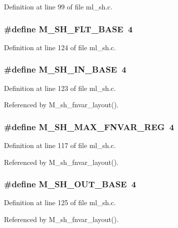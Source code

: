 Definition at line 99 of file ml\_\-sh.c.
\subsubsection{\setlength{\rightskip}{0pt plus 5cm}\#define M\_\-SH\_\-FLT\_\-BASE~4}\label{ml__sh_8c_44db1d3112e4bea8f4a00158c9dc2655}




Definition at line 124 of file ml\_\-sh.c.
\subsubsection{\setlength{\rightskip}{0pt plus 5cm}\#define M\_\-SH\_\-IN\_\-BASE~4}\label{ml__sh_8c_9855423f22bab7123e1c6e9ba0e6407b}




Definition at line 123 of file ml\_\-sh.c.

Referenced by M\_\-sh\_\-fnvar\_\-layout().
\subsubsection{\setlength{\rightskip}{0pt plus 5cm}\#define M\_\-SH\_\-MAX\_\-FNVAR\_\-REG~4}\label{ml__sh_8c_1c5cf2daf08367469b681e7524ece98e}




Definition at line 117 of file ml\_\-sh.c.

Referenced by M\_\-sh\_\-fnvar\_\-layout().
\subsubsection{\setlength{\rightskip}{0pt plus 5cm}\#define M\_\-SH\_\-OUT\_\-BASE~4}\label{ml__sh_8c_234b6bffa3a988f125d841700a9b8517}




Definition at line 125 of file ml\_\-sh.c.

Referenced by M\_\-sh\_\-fnvar\_\-layout().
